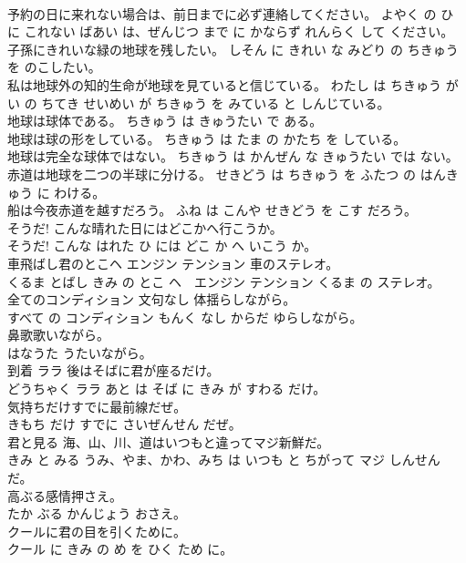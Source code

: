 \documentclass[8pt]{extreport}
\begin{document}
\begin{CJK}{UTF8}{min}
\\	予約の日に来れない場合は、前日までに必ず連絡してください。	よやく の ひ に これない ばあい は、ぜんじつ まで に かならず れんらく して ください。	
\\	子孫にきれいな緑の地球を残したい。	しそん に きれい な みどり の ちきゅう を のこしたい。	
\\	私は地球外の知的生命が地球を見ていると信じている。	わたし は ちきゅう がい の ちてき せいめい が ちきゅう を みている と しんじている。	
\\	地球は球体である。	ちきゅう は きゅうたい で ある。	
\\	地球は球の形をしている。	ちきゅう は たま の かたち を している。	
\\	地球は完全な球体ではない。	ちきゅう は かんぜん な きゅうたい では ない。	
\\	赤道は地球を二つの半球に分ける。	せきどう は ちきゅう を ふたつ の はんきゅう に わける。	
\\	船は今夜赤道を越すだろう。	ふね は こんや せきどう を こす だろう。	
\\	そうだ! こんな晴れた日にはどこかへ行こうか。	
\\	そうだ! こんな はれた ひ には どこ か へ いこう か。	
\\	車飛ばし君のとこヘ エンジン テンション 車のステレオ。	
\\	くるま とばし きみ の とこ ヘ　エンジン テンション くるま の ステレオ。	
\\	全てのコンディション 文句なし 体揺らしながら。	
\\	すべて の コンディション もんく なし からだ ゆらしながら。	
\\	鼻歌歌いながら。	
\\	はなうた うたいながら。	
\\	到着 ララ 後はそばに君が座るだけ。	
\\	どうちゃく ララ あと は そば に きみ が すわる だけ。	
\\	気持ちだけすでに最前線だぜ。	
\\	きもち だけ すでに さいぜんせん だぜ。	
\\	君と見る 海、山、川、道はいつもと違ってマジ新鮮だ。	
\\	きみ と みる うみ、やま、かわ、みち は いつも と ちがって マジ しんせん だ。	
\\	高ぶる感情押さえ。	
\\	たか ぶる かんじょう おさえ。	
\\	クールに君の目を引くために。	
\\	クール に きみ の め を ひく ため に。	

\end{CJK}
\end{document}
